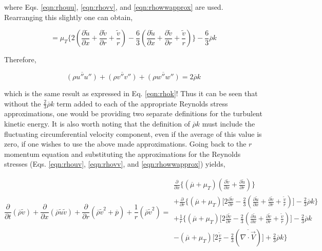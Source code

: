 	where Eqs. \ref{eqn:rhouu}, \ref{eqn:rhovv}, and \ref{eqn:rhowwapprox} are used.  Rearranging this slightly 
one can obtain,

\begin{displaymath}
	= \mu_T \Big\{2(\frac{\partial \tilde{u}}{\partial x} + \frac{\partial \tilde{v}}{\partial r} + \frac{\tilde{v}}{r})
	-\frac{6}{3}(\frac{\partial \tilde{u}}{\partial x} + \frac{\partial \tilde{v}}{\partial r} + 
	\frac{\tilde{v}}{r})\Big\} -\frac{6}{3}\overline{\rho}k
\end{displaymath}

	Therefore,

\begin{displaymath}
	\overline{(\rho u'' u'')} + \overline{(\rho v'' v'')} + \overline{(\rho w'' w'')} =
	2\overline{\rho}k	
\end{displaymath}

	which is the same result as expressed in Eq. \ref{eqn:rhok}!  Thus it can be seen that without the 
$\frac{2}{3}\overline{\rho}k$ term added to each of the appropriate Reynolds stress approximations, one would be
providing two separate definitions for the turbulent kinetic energy.  It is also worth noting that the definition of 
$\overline{\rho}k$ must include the fluctuating
circumferential velocity component, even if the average of this value is zero, if one wishes to use the 
above made approximations.
	Going back to the $r$ momentum equation and substituting the approximations for the Reynolds stresses
(Eqs. \ref{eqn:rhouv}, \ref{eqn:rhovv}, and \ref{eqn:rhowwapprox}) yields,

\begin{displaymath}
	\frac{\partial}{\partial t}(\overline{\rho}\tilde{v}) + \frac{\partial}{\partial x}
	(\overline{\rho}\tilde{u}\tilde{v}) + \frac{\partial}{\partial r} (\overline{\rho}\tilde{v}^2 
	+ \overline{p})+ \frac{1}{r}(\overline{\rho}\tilde{v}^2) =
	\begin{array}{c}
		\frac{\partial}{\partial x}\Big\{(\overline{\mu} + \mu_T)
		(\frac{\partial \tilde{v}}{\partial x} + \frac{\partial \tilde{u}}{\partial r})\Big\} 
		\\ + \frac{\partial}{\partial r}\Big\{
		(\overline{\mu} + \mu_T)\Big[2\frac{\partial \tilde{v}}{\partial r} - \frac{2}{3}(\frac{\partial \tilde{u}}
		{\partial x} + \frac{\partial \tilde{v}}{\partial r} + \frac{\tilde{v}}{r})\Big] -\frac{2}{3}\overline{\rho}k
		\Big\}  \\
		+ \frac{1}{r}\Big\{
		(\overline{\mu} + \mu_T)\Big[2\frac{\partial \tilde{v}}{\partial r} - \frac{2}{3}(\frac{\partial \tilde{u}}
		{\partial x} + \frac{\partial \tilde{v}}{\partial r} + \frac{\tilde{v}}{r})\Big] -\frac{2}{3}\overline{\rho}k 
		\\ -  
	 	(\overline{\mu}+\mu_T)\Big[2\frac{\tilde{v}}{r} -\frac{2}{3}(\overline{\nabla \cdot \vec{V}}) 
		\Big] +\frac{2}{3}\overline{\rho}k\Big\}
	\end{array}
\end{displaymath}

